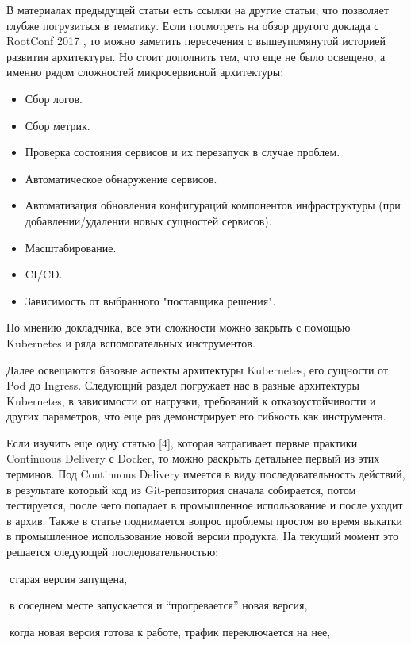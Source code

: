 В материалах предыдущей статьи есть ссылки на другие статьи, что позволяет глубже погрузиться в тематику. Если посмотреть на обзор другого доклада с RootConf 2017 \cite{habr:flant:k8s-small-projects}, то можно заметить пересечения с вышеупомянутой историей развития архитектуры. Но стоит дополнить тем, что еще не было освещено, а именно рядом сложностей микросервисной архитектуры:
\begin{itemize}
    \item Сбор логов.
    \item Сбор метрик.
    \item Проверка состояния сервисов и их перезапуск в случае проблем.
    \item Автоматическое обнаружение сервисов.
    \item Автоматизация обновления конфигураций компонентов инфраструктуры (при добавлении/удалении новых сущностей сервисов).
    \item Масштабирование.
    \item CI/CD.
    \item Зависимость от выбранного "поставщика решения".
\end{itemize}

По мнению докладчика, все эти сложности можно закрыть с помощью Kubernetes и ряда вспомогательных инструментов.

Далее освещаются базовые аспекты архитектуры Kubernetes, его сущности от Pod до Ingress. Следующий раздел погружает нас в разные архитектуры Kubernetes, в зависимости от нагрузки, требований к отказоустойчивости и других параметров, что еще раз демонстрирует его гибкость как инструмента.

Если изучить еще одну статью [4], которая затрагивает первые практики Continuous Delivery с Docker, то можно раскрыть детальнее первый из этих терминов. Под Continuous Delivery имеется в виду последовательность действий, в результате который код из Git-репозитория сначала собирается, потом тестируется, после чего попадает в промышленное использование и после уходит в архив. Также в статье поднимается вопрос проблемы простоя во время выкатки в промышленное использование новой версии продукта. На текущий момент это решается следующей последовательностью:

старая версия запущена,

в соседнем месте запускается и “прогревается” новая версия,

когда новая версия готова к работе, трафик переключается на нее,

